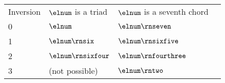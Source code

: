 \begin{tabular}{l|lll}
Inversion & $\elnum$ is a triad & $\elnum$ is a seventh chord \\
0 & $\elnum$ & $\elnum\rnseven$ \\
1 & $\elnum\rnsix$ & $\elnum\rnsixfive$ \\
2 & $\elnum\rnsixfour$ & $\elnum\rnfourthree$ \\
3 & (not possible) & $\elnum\rntwo$ \\
\end{tabular}
    